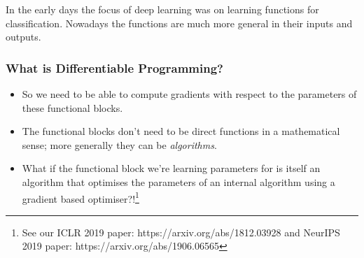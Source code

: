 \documentclass[]{article}
\begin{document}
In the early days the focus of deep learning was on learning functions for classification. Nowadays the functions are much more general in their inputs and outputs.


\begin{frame}
\frametitle{What is Differentiable Programming?}

\begin{itemize}
		\item<+-> So we need to be able to compute gradients with respect to the parameters of these functional blocks.
			\item<+-> The functional blocks don't need to be direct functions in a mathematical sense; more generally they can be \emph{algorithms}.
			\item<+-> What if the functional block we're learning parameters for is itself an algorithm that optimises the parameters of an internal algorithm using a gradient based optimiser?!\footnote{See our ICLR 2019 paper: https://arxiv.org/abs/1812.03928 and NeurIPS 2019 paper: https://arxiv.org/abs/1906.06565}
\end{itemize}
\end{frame}
\end{document}
